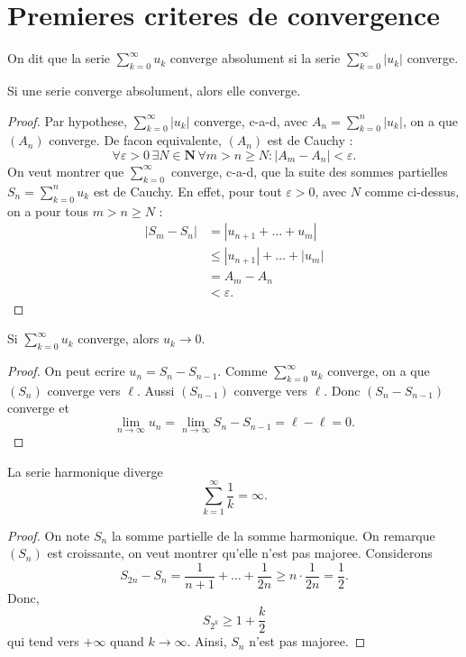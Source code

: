 \section{Premieres criteres de convergence}
\begin{definition}
On dit que la serie $\sum_{k=0}^{\infty}u_{k}$ converge absolument si la serie $\sum_{k=0}^{\infty}|u_{k}|$ converge.
\end{definition}
\begin{theorem}
Si une serie converge absolument, alors elle converge.
\end{theorem}
\begin{proof}
Par hypothese, $\sum_{k=0}^{\infty}|u_k|$ converge, c-a-d, avec $A_{n}=\sum_{k=0}^{n}|u_{k}|$, on a que $(A_{n})$ converge. De facon equivalente, $(A_{n})$ est de Cauchy :
$$
\forall\varepsilon>0\,\exists N\in \mathbf{N}\,\forall m>n\ge N:|A_{m}-A_{n}|<\varepsilon.
$$
On veut montrer que $\sum_{k=0}^{\infty}$ converge, c-a-d, que la suite des sommes partielles $S_{n}=\sum_{k=0}^{n}u_{k}$ est de Cauchy. En effet, pour tout $\varepsilon>0$, avec $N$ comme ci-dessus, on a pour tous $m>n\ge N$ :
\begin{align*}
|S_{m}-S_{n}| & =|u_{n+1}+\dots +u_{m}| \\
 & \le |u_{n+1}|+\dots +|u_{m}| \\
 & = A_{m}-A_{n} \\
  & < \varepsilon.
\end{align*}
\end{proof}
\begin{theorem}
Si $\sum_{k=0}^{\infty}u_{k}$ converge, alors $u_{k}\to 0$.
\end{theorem}
\begin{proof}
On peut ecrire $u_{n}=S_{n}-S_{n-1}$. Comme $\sum_{k=0}^{\infty}u_{k}$ converge, on a que $(S_{n})$ converge vers $\ell$. Aussi $(S_{n-1})$ converge vers $\ell$. Donc $(S_{n}-S_{n-1})$ converge et 
$$
\lim_{ n \to \infty } u_{n}=\lim_{ n \to \infty } S_{n}-S_{n-1}=\ell -\ell=0.
$$
\end{proof}
\begin{proposition}
La serie harmonique diverge
$$
\sum_{k=1}^{\infty}  \frac{1}{k}=\infty.
$$
\end{proposition}
\begin{proof}
On note $S_{n}$ la somme partielle de la somme harmonique. On remarque $(S_{n})$ est croissante, on veut montrer qu'elle n'est pas majoree. Considerons
$$
S_{2n}-S_{n}=\frac{1}{n+1}+\dots +\frac{1}{2n}\ge n \cdot\frac{1}{2n}=\frac{1}{2}.
$$
Donc,
$$
S_{2^{k}}\ge 1+ \frac{k}{2}
$$
qui tend vers $+\infty$ quand $k\to \infty$. Ainsi, $S_{n}$ n'est pas majoree.
\end{proof}
